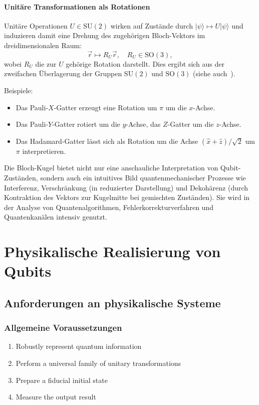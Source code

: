 \vspace{0.5em}
\paragraph{Unitäre Transformationen als Rotationen}

Unitäre Operationen $U \in \text{SU}(2)$ wirken auf Zustände durch $|\psi\rangle \mapsto U|\psi\rangle$ und induzieren damit eine Drehung des zugehörigen Bloch-Vektors im dreidimensionalen Raum:
\[
\vec{r} \mapsto R_U \vec{r}, \quad R_U \in \text{SO}(3),
\]
wobei $R_U$ die zur $U$ gehörige Rotation darstellt. Dies ergibt sich aus der zweifachen Überlagerung der Gruppen $\text{SU}(2)$ und $\text{SO}(3)$ (siehe auch~\cite{sakuraiQM}).

Beispiele:
\begin{itemize}
    \item Das Pauli-$X$-Gatter erzeugt eine Rotation um $\pi$ um die $x$-Achse.
    \item Das Pauli-$Y$-Gatter rotiert um die $y$-Achse, das $Z$-Gatter um die $z$-Achse.
    \item Das Hadamard-Gatter lässt sich als Rotation um die Achse $(\hat{x} + \hat{z})/\sqrt{2}$ um $\pi$ interpretieren.
\end{itemize}


Die Bloch-Kugel bietet nicht nur eine anschauliche Interpretation von Qubit-Zuständen, sondern auch ein intuitives Bild quantenmechanischer Prozesse wie Interferenz, Verschränkung (in reduzierter Darstellung) und Dekohärenz (durch Kontraktion des Vektors zur Kugelmitte bei gemischten Zuständen). Sie wird in der Analyse von Quantenalgorithmen, Fehlerkorrekturverfahren und Quantenkanälen intensiv genutzt.




\section{Physikalische Realisierung von Qubits }
\subsection{Anforderungen an physikalische Systeme }
\subsubsection{Allgemeine Voraussetzungen}

\begin{enumerate}
    \item Robustly represent quantum information
    \item Perform a universal family of unitary transformations
    \item Prepare a fiducial initial state
    \item Measure the output result
\end{enumerate}

